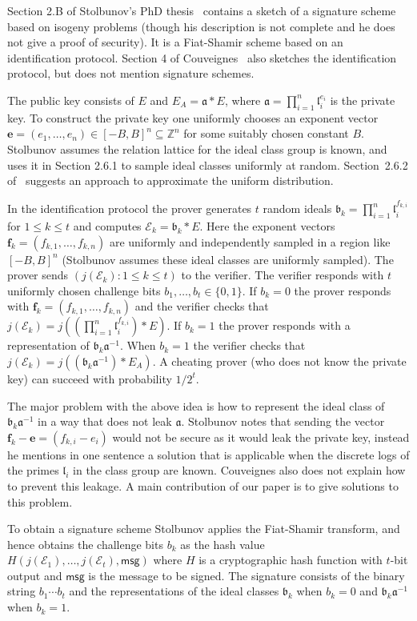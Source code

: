\documentclass{llncs}
\newcommand{\E}{\mathcal{E}}
\newcommand{\Z}{\mathbb{Z}}
\newcommand{\msg}{\mathsf{msg}}
\renewcommand{\a}{\mathfrak{a}}
\renewcommand{\b}{\mathfrak{b}}
\renewcommand{\l}{\mathfrak{l}}
\newcommand{\e}{\mathbf{e}}
\newcommand{\f}{\mathbf{f}}
\begin{document}
Section 2.B of Stolbunov's PhD thesis~\cite{Sto12} contains a sketch of a signature scheme based on isogeny problems (though his description is not complete and he does not give a proof of security).
It is a Fiat-Shamir scheme based on an identification protocol.
Section 4 of Couveignes~\cite{Couv06} also sketches the identification protocol, but does not mention signature schemes.


The public key consists of $E$ and $E_A = \a * E$, where $\a = \prod_{i=1}^n \l_i^{e_i}$ is the private key.
To construct the private key one uniformly chooses an exponent vector $\e = (e_1, \dots, e_n) \in [-B,B]^n \subseteq \Z^n$ for some suitably chosen constant $B$.
Stolbunov assumes the relation lattice for the ideal class group is known, and uses it in Section 2.6.1 to sample ideal classes uniformly at random.
Section~2.6.2 of~\cite{Sto12} suggests an approach to approximate the uniform distribution.

In the identification protocol the prover generates $t$ random ideals $\b_k = \prod_{i=1}^n \l_i^{f_{k,i}}$ for $1 \le k \le t$ and computes $\E_k = \b_k * E$.
Here the exponent vectors $\f_k = ( f_{k,1}, \dots, f_{k,n} )$ are uniformly and independently sampled in a region like $[-B,B]^n$ (Stolbunov assumes these ideal classes are uniformly sampled).
The prover sends $(j( \E_k ) : 1 \le k \le t )$ to the verifier.
The verifier responds with $t$ uniformly chosen challenge bits $b_1, \dots, b_t \in \{0,1\}$.
If $b_k = 0$ the prover responds with $\f_k = ( f_{k,1}, \dots, f_{k,n} )$ and the verifier checks that $j(\E_k) = j( (\prod_{i=1}^n \l_i^{f_{k,i}}) * E )$.
If $b_k = 1$ the prover responds with a representation of $\b_k \a^{-1}$.
When $b_k=1$ the verifier checks that $j(\E_k) = j( (\b_k \a^{-1}) * E_A )$.
A cheating prover (who does not know the private key) can succeed with probability $1/2^t$.

The major problem with the above idea is how to represent the ideal class of $\b_k \a^{-1}$ in a way that does not leak $\a$.
Stolbunov notes that sending the vector $\f_k - \e = (f_{k,i} - e_i )$ would not be secure as it would leak the private key, instead he mentions in one sentence a solution that is applicable when the discrete logs of the primes $\l_i$ in the class group are known.
Couveignes also does not explain how to prevent this leakage.
A main contribution of our paper is to give solutions to this problem.

To obtain a signature scheme Stolbunov applies the Fiat-Shamir transform, and hence obtains the challenge bits $b_k$ as the hash value $H( j(\E_1), \dots, j(\E_t) , \msg )$ where $H$ is a cryptographic hash function with $t$-bit output and $\msg$ is the message to be signed.
The signature consists of the binary string $b_1\cdots b_t$ and the representations of the ideal classes $\b_k$ when $b_k = 0$ and $\b_k \a^{-1}$ when $b_k = 1$.
\end{document}
